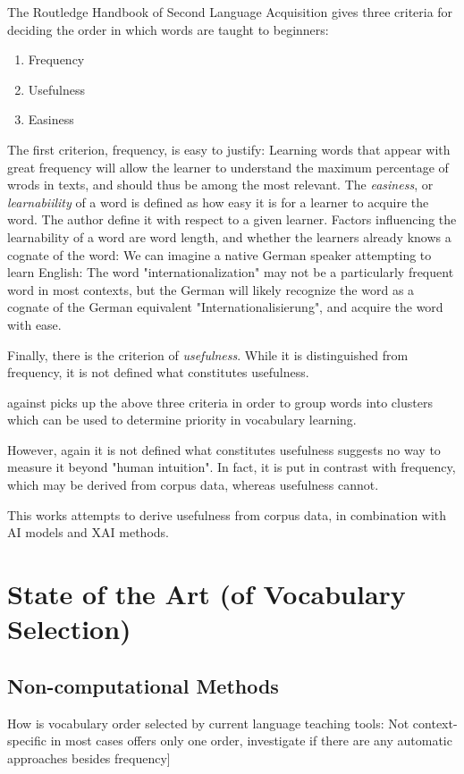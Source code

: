 The Routledge Handbook of Second Language Acquisition  gives three criteria for deciding the order in which words are taught to beginners:
\begin{enumerate}
	\item Frequency
	\item Usefulness
	\item Easiness
\end{enumerate}
The first criterion, frequency, is easy to justify:
Learning words that appear with great frequency will allow the learner to understand the maximum percentage of wrods in texts, and should thus be among the most relevant.
The \textit{easiness}, or \textit{learnabiility} of a word is defined as how easy it is for a learner to acquire the word.
The author define it with respect to a given learner.
Factors influencing the learnability of a word are word length, and whether the learners already knows a cognate of the word:
We can imagine a native German speaker attempting to learn English:
The word "internationalization" may not be a particularly frequent word in most contexts, but the German will likely recognize the word as a cognate of the German equivalent "Internationalisierung", and acquire the word with ease.

Finally, there is the criterion of \textit{usefulness}.
While it is distinguished from frequency, it is not defined what constitutes usefulness.

 against picks up the above three criteria in order to group words into clusters which can be used to determine priority in vocabulary learning.

However, again it is not defined what constitutes usefulness suggests no way to measure it beyond "human intuition".
In fact, it is put in contrast with frequency, which may be derived from corpus data, whereas usefulness cannot.

This works attempts to derive usefulness from corpus data, in combination with AI models and XAI methods.



\section{State of the Art (of Vocabulary Selection)} \label{sec:state-of-the-art-vocabulary-selection}
\subsection{Non-computational Methods}
How is vocabulary order selected by current language teaching tools:
Not context-specific in most cases
offers only one order,
investigate if there are any automatic approaches besides frequency]


